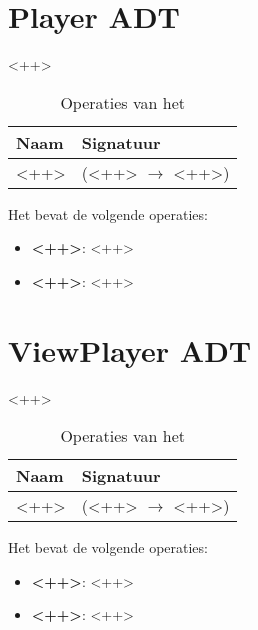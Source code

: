 \section{Player ADT}
\label{section:player}

<++>

\begin{table}[hbt]
\centering
\begin{tabular}{|ll|}
\hline
\rowcolor[HTML]{000000} 
{\color[HTML]{FFFFFF} \textbf{Naam}} & {\color[HTML]{FFFFFF} \textbf{Signatuur}} \\ \hline
<++>                                 & (<++> $\rightarrow$ <++>)                                       \\ \hline
\end{tabular}
\caption{Operaties van het \texttt{}}
\label{table:ant}
\end{table}

Het \texttt{} bevat de volgende operaties:

\begin{itemize}
	\item \textbf{<++>}: <++>
	\item \textbf{<++>}: <++>
\end{itemize}

\section{View\textunderscore Player ADT}
\label{section:view_ant}

<++>

\begin{table}[hbt]
\centering
\begin{tabular}{|ll|}
\hline
\rowcolor[HTML]{000000} 
{\color[HTML]{FFFFFF} \textbf{Naam}} & {\color[HTML]{FFFFFF} \textbf{Signatuur}} \\ \hline
<++>                                 & (<++> $\rightarrow$ <++>)                                       \\ \hline
\end{tabular}
\caption{Operaties van het \texttt{}}
\label{table:view_ant}
\end{table}

Het \texttt{} bevat de volgende operaties:

\begin{itemize}
	\item \textbf{<++>}: <++>
	\item \textbf{<++>}: <++>
\end{itemize}

